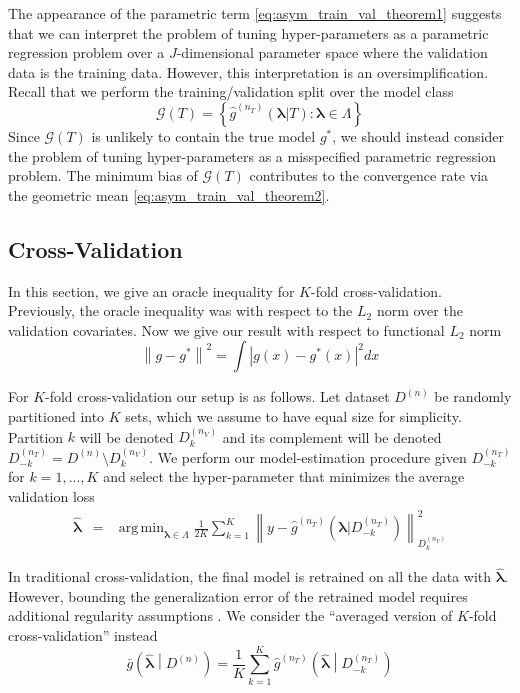 \documentclass[12pt]{article}
\DeclareMathOperator*{\argmin}{arg\,min}
\begin{document}
The appearance of the parametric term \eqref{eq:asym_train_val_theorem1} suggests that we can interpret the problem of tuning hyper-parameters as a parametric regression problem over a $J$-dimensional parameter space where the validation data is the training data. However, this interpretation is an oversimplification. Recall that we perform the training/validation split over the model class
\begin{equation}
\mathcal{G}(T) = \left \{ \hat{g}^{(n_T)}( {\boldsymbol{\lambda}}| T) : \boldsymbol{\lambda} \in \Lambda \right \}
\end{equation}
Since $\mathcal{G}(T)$ is unlikely to contain the true model $g^*$, we should instead consider the problem of tuning hyper-parameters as a misspecified parametric regression problem. The minimum bias of $\mathcal{G}(T)$ contributes to the convergence rate via the geometric mean \eqref{eq:asym_train_val_theorem2}.

\subsection{Cross-Validation}\label{sec:cv}

In this section, we give an oracle inequality for $K$-fold cross-validation. Previously, the oracle inequality was with respect to the $L_2$ norm over the validation covariates. Now we give our result with respect to functional $L_2$ norm
\begin{equation}
\left \| g - g^* \right \|^2 = \int \left |g(x) - g^*(x) \right |^2 dx
\end{equation}

For $K$-fold cross-validation our setup is as follows. Let dataset $D^{(n)}$ be randomly partitioned into $K$ sets, which we assume to have equal size for simplicity. Partition $k$ will be denoted $D_k^{(n_V)}$ and its complement will be denoted $D_{-k}^{(n_T)} = D^{(n)} \setminus D_k^{(n_V)}$. We perform our model-estimation procedure given $D_{-k}^{(n_T)}$ for $k=1,...,K$ and select the hyper-parameter that minimizes the average validation loss
\begin{eqnarray}
\label{kfold_opt}
\hat{\boldsymbol \lambda} &=& \argmin_{\boldsymbol{\lambda} \in\Lambda} \frac{1}{2K} \sum_{k=1}^K  \left \| y-\hat{g}^{(n_T)}(\boldsymbol \lambda | D_{-k}^{(n_T)}) \right \|_{D_k^{(n_V)}}^{2}
\end{eqnarray}

In traditional cross-validation, the final model is retrained on all the data with $\hat{\boldsymbol{\lambda}}$. However, bounding the generalization error of the retrained model requires additional regularity assumptions \citep{lecue2012oracle}. We consider the ``averaged version of $K$-fold cross-validation'' instead
\begin{equation}
\label{thrm:avg_cv}
\bar{g}\left ( \hat{\boldsymbol \lambda} \middle | {D^{(n)}} \right ) = 
\frac{1}{K} \sum_{k=1}^K 
\hat{g}^{(n_T)} \left (\hat{\boldsymbol \lambda} \middle | D^{(n_T)}_{-k} \right )
\end{equation}
\end{document}
